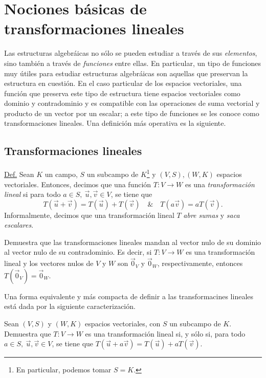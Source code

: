 \documentclass[apuntes]{subfiles}
\begin{document}
\section{Nociones básicas de transformaciones lineales} \label{Sec: Nociones básicas de transformaciones lineales}

Las estructuras algebráicas no sólo se pueden estudiar a través de sus \emph{elementos}, sino también a través de \emph{funciones} entre ellas. En particular, un tipo de funciones muy útiles para estudiar estructuras algebráicas son aquellas que preservan la estructura en cuestión. En el caso particular de los espacios vectoriales, una función que preserva este tipo de estructura tiene espacios vectoriales como dominio y contradominio y es compatible con las operaciones de suma vectorial y producto de un vector por un escalar; a este tipo de funciones se les conoce como transformaciones lineales. Una definición más operativa es la siguiente.

\subsection*{Transformaciones lineales} \label{Ssec: Definición de transformación lineal}

\begin{tcolorbox}
\underline{Def.} Sean $K$ un campo, $S$ un subcampo de $K$\footnote{En particular, podemos tomar $S=K$.} y $(V,S), (W,K)$ espacios vectoriales. Entonces, decimos que una función $T:V\to W$ es una \emph{transformación lineal} si para todo $a\in S, \ \vec{u},\vec{v}\in V$, se tiene que
\[
T(\vec{u}+\vec{v}) = T(\vec{u})+T(\vec{v}) \quad \& \quad T(a\vec{v}) = aT(\vec{v}).
\]
Informalmente, decimos que una transformación lineal $T$ \emph{abre sumas} y \emph{saca escalares}.
\end{tcolorbox}

\begin{ejer}\label{ejer-16}
    Demuestra que las transformaciones lineales mandan al vector nulo de su dominio al vector nulo de su contradominio. Es decir, si $T:V\to W$ es una transformación lineal y los vectores nulos de $V$ y $W$ son $\vec{0}_V$ y $\vec{0}_W$, respectivamente, entonces $T(\vec{0}_V) = \vec{0}_W$.
\end{ejer}

Una forma equivalente y más compacta de definir a las transformacines lineales está dada por la siguiente caracterización.

\begin{ejer}\label{ejer:17}
Sean $(V,S)$ y $(W,K)$ espacios vectoriales, con $S$ un subcampo de $K$. Demuestra que $T:V\to W$ es una transformación lineal si, y sólo si, para todo $a\in S, \ \vec{u},\vec{v}\in V$, se tiene que $T(\vec{u}+a\vec{v}) = T(\vec{u})+aT(\vec{v})$.
\end{ejer}
\end{document}
